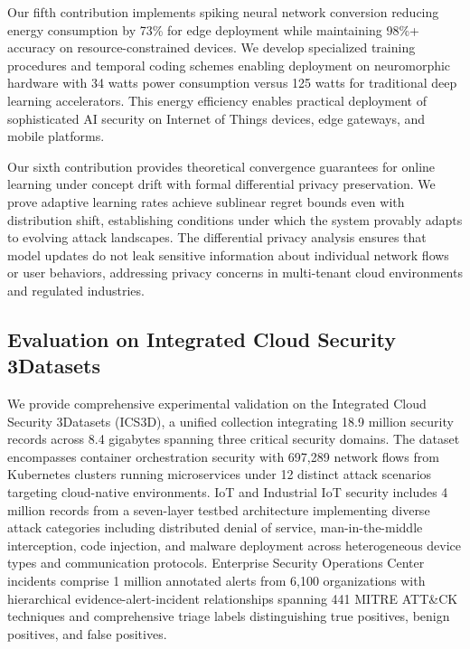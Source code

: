 \documentclass[10pt,journal,compsoc]{IEEEtran}
\begin{document}
Our fifth contribution implements spiking neural network conversion reducing energy consumption by 73\% for edge deployment while maintaining 98\%+ accuracy on resource-constrained devices. We develop specialized training procedures and temporal coding schemes enabling deployment on neuromorphic hardware with 34 watts power consumption versus 125 watts for traditional deep learning accelerators. This energy efficiency enables practical deployment of sophisticated AI security on Internet of Things devices, edge gateways, and mobile platforms.

Our sixth contribution provides theoretical convergence guarantees for online learning under concept drift with formal differential privacy preservation. We prove adaptive learning rates achieve sublinear regret bounds even with distribution shift, establishing conditions under which the system provably adapts to evolving attack landscapes. The differential privacy analysis ensures that model updates do not leak sensitive information about individual network flows or user behaviors, addressing privacy concerns in multi-tenant cloud environments and regulated industries.

\subsection{Evaluation on Integrated Cloud Security 3Datasets}

We provide comprehensive experimental validation on the Integrated Cloud Security 3Datasets (ICS3D), a unified collection integrating 18.9 million security records across 8.4 gigabytes spanning three critical security domains. The dataset encompasses container orchestration security with 697,289 network flows from Kubernetes clusters running microservices under 12 distinct attack scenarios targeting cloud-native environments. IoT and Industrial IoT security includes 4 million records from a seven-layer testbed architecture implementing diverse attack categories including distributed denial of service, man-in-the-middle interception, code injection, and malware deployment across heterogeneous device types and communication protocols. Enterprise Security Operations Center incidents comprise 1 million annotated alerts from 6,100 organizations with hierarchical evidence-alert-incident relationships spanning 441 MITRE ATT\&CK techniques and comprehensive triage labels distinguishing true positives, benign positives, and false positives.
\end{document}
